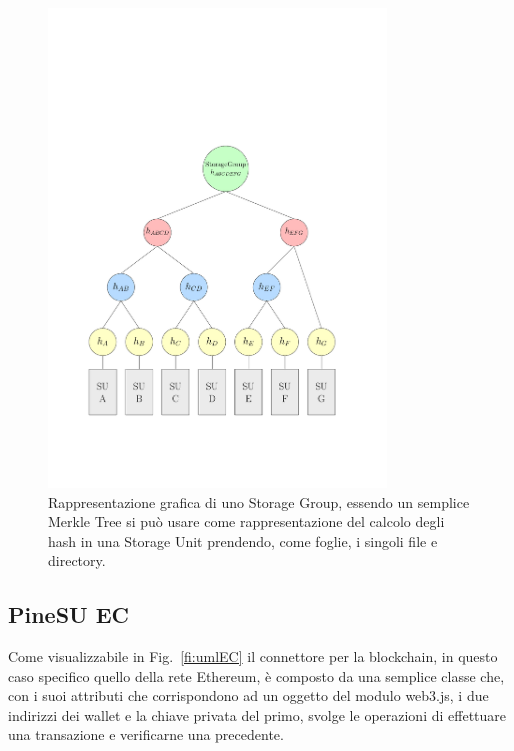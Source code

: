 \begin{figure}[H]
    \centering
    \includegraphics[width=0.8\textwidth]{Figures/sg1}
    \caption{\small{
    Rappresentazione grafica di uno Storage Group, essendo un semplice Merkle Tree
    si può usare come rappresentazione del calcolo degli hash in una Storage Unit
    prendendo, come foglie, i singoli file e directory.
    } %
    } %
    \label{fi:SG}
\end{figure}
 
\subsection{PineSU EC}

Come visualizzabile in Fig.~\ref{fi:umlEC} il connettore per la blockchain, in questo caso specifico quello della rete Ethereum, è composto da una semplice classe che, con i suoi attributi che corrispondono ad un oggetto del modulo \textsf{web3.js}, i due indirizzi dei wallet e la chiave privata del primo, svolge le operazioni di effettuare una transazione e verificarne una precedente.

